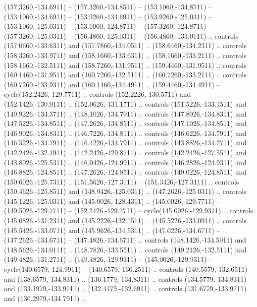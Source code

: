 \begin{scope}[cm={{1.25,0.0,0.0,-1.25,(0.0,442.91375)}}]
\begin{scope}[xscale=1.000,yscale=-1.000,fill=c545457,line join=miter,line cap=butt,line width=0.800pt]
      (157.3260,-134.6911) -- (157.3260,-134.8511) -- (153.1060,-134.8511) --
      (153.1060,-134.6911) -- (153.9260,-134.6911) -- (153.9260,-125.0311) --
      (153.1060,-125.0311) -- (153.1060,-124.8711) -- (157.3260,-124.8711) --
      (157.3260,-125.0311) -- (156.4860,-125.0311) -- (156.4860,-133.0111) ..
      controls (157.0660,-133.6311) and (157.7860,-134.0511) .. (158.6460,-134.2311)
      .. controls (158.3260,-133.9711) and (158.1660,-133.6311) ..
      (158.1660,-133.2111) .. controls (158.1660,-132.5111) and (158.7260,-131.9511)
      .. (159.4460,-131.9511) .. controls (160.1460,-131.9511) and
      (160.7260,-132.5111) .. (160.7260,-133.2111) .. controls (160.7260,-133.9311)
      and (160.1460,-134.4911) .. (159.4460,-134.4911) -- cycle(152.2426,-129.7711)
      .. controls (152.2226,-130.5711) and (152.1426,-130.9111) ..
      (152.0626,-131.1711) .. controls (151.5226,-133.1511) and (149.9226,-134.3711)
      .. (148.1026,-134.7911) .. controls (147.8026,-134.8311) and
      (147.5226,-134.8511) .. (147.2626,-134.8511) .. controls (147.1026,-134.8511)
      and (146.9026,-134.8311) .. (146.7226,-134.8111) .. controls
      (146.6226,-134.7911) and (146.5226,-134.7911) .. (146.4226,-134.7911) ..
      controls (143.8826,-134.2711) and (142.2426,-132.1911) .. (142.2426,-129.8711)
      .. controls (142.2426,-127.5511) and (143.8026,-125.5311) ..
      (146.0426,-124.9911) .. controls (146.2826,-124.9311) and (146.8826,-124.8511)
      .. (147.2626,-124.8511) .. controls (149.0226,-124.8511) and
      (150.6026,-125.7311) .. (151.5626,-127.3111) -- (151.3426,-127.3111) ..
      controls (150.4626,-125.8511) and (148.9426,-125.0311) .. (147.2626,-125.0311)
      .. controls (145.1226,-125.0311) and (145.0026,-128.4311) ..
      (145.0026,-129.7711) -- (149.5026,-129.7711) -- (152.2426,-129.7711) --
      cycle(145.0026,-129.9311) .. controls (145.0826,-131.2311) and
      (145.2226,-132.1511) .. (145.5226,-133.0911) .. controls (145.5426,-133.0711)
      and (145.9626,-134.5311) .. (147.0226,-134.6711) -- (147.2626,-134.6711) --
      (147.4826,-134.6711) .. controls (148.1426,-134.5911) and (148.5626,-134.0111)
      .. (148.7826,-133.5511) .. controls (149.2426,-132.5111) and
      (149.4826,-131.2711) .. (149.4826,-129.9311) -- (145.0026,-129.9311) --
      cycle(140.6579,-124.9911) -- (140.6579,-130.2511) .. controls
      (140.5579,-132.6511) and (138.6579,-134.8311) .. (136.1779,-134.8311) ..
      controls (134.5779,-134.8311) and (133.1979,-133.9711) .. (132.4179,-132.6911)
      .. controls (131.6779,-133.9711) and (130.2979,-134.7911) ..

\end{scope}
\end{scope}
